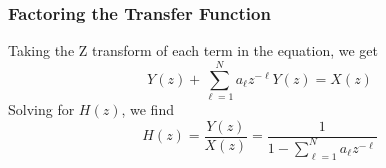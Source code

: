 \begin{frame}
  \frametitle{Factoring the Transfer Function}

  Taking the Z transform of each term in the equation, we get
  \[
  Y(z) + \sum_{\ell=1}^N a_\ell z^{-\ell} Y(z) = X(z)
  \]
  Solving for $H(z)$, we find
  \[
  H(z) = \frac{Y(z)}{X(z)} = \frac{1}{1-\sum_{\ell=1}^N a_\ell z^{-\ell}}
  \]
\end{frame}



%
%

